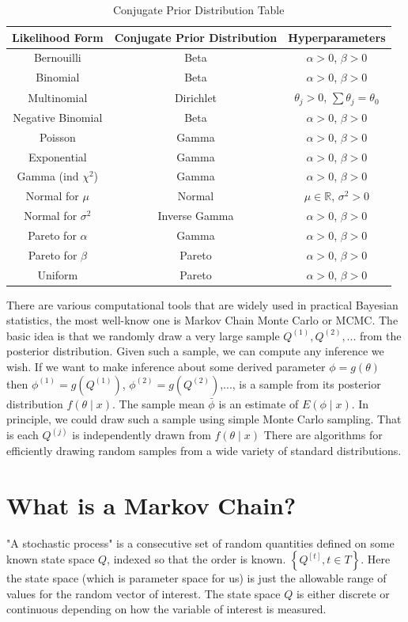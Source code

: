 \documentclass[lecture,12pt,]{pcms-l}
\numberwithin{section}{chapter}
\numberwithin{equation}{chapter}
\theoremstyle{plain}
\theoremstyle{definition}
\theoremstyle{definition}
\begin{document}
\begin{table}[h]
\caption{Conjugate Prior Distribution Table}
 \begin{tabular}{||c c c ||} 
 \hline
 Likelihood Form & Conjugate Prior Distribution & Hyperparameters  \\ [0.5ex]
 \hline\hline
 Bernouilli & Beta & $\alpha>0$, $\beta>0$ \\ 
 Binomial & Beta & $\alpha>0$, $\beta>0$   \\ 
 Multinomial & Dirichlet & $\theta_j>0$, $\sum \theta_j=\theta_0$  \\ 
 Negative Binomial & Beta & $\alpha>0$, $\beta>0$  \\ 
 Poisson & Gamma & $\alpha>0$, $\beta>0$  \\
 Exponential & Gamma & $\alpha>0$, $\beta>0$  \\
 Gamma (ind $\chi^2$) & Gamma & $\alpha>0$, $\beta>0$  \\
 Normal for $\mu$ & Normal & $\mu \in \mathbb{R}$, $\sigma^2>0$  \\
  Normal for $\sigma^2$ & Inverse Gamma & $\alpha>0$, $\beta>0$  \\
   Pareto for $\alpha$ & Gamma & $\alpha>0$, $\beta>0$  \\
    Pareto for $\beta$ & Pareto &$\alpha>0$, $\beta>0$  \\
 Uniform & Pareto & $\alpha>0$, $\beta>0$ \\ [1ex] 
 \hline
\end{tabular}
\end{table}

There are various computational tools that are widely used in practical Bayesian statistics, the most well-know one is Markov Chain Monte Carlo or MCMC. The basic idea is that we randomly draw a very large sample $Q^{(1)},Q^{(2)},...$ from the posterior distribution. Given such a sample, we can compute any inference we wish. If we want to make inference about some derived parameter $\phi=g(\theta)$ then $\phi^{(1)}=g(Q^{(1)})$, $\phi^{(2)}=g(Q^{(2)})$,..., is a sample from its posterior distribution $f(\theta \mid x)$. The sample mean $\bar{\phi}$ is an estimate of $E(\phi \mid x)$. In principle, we could draw such a sample using simple Monte Carlo sampling. That is each $Q^{(j)}$ is independently drawn from $f(\theta \mid x)$ There are algorithms for efficiently drawing random samples from a wide variety of standard distributions. 
\section{What is a Markov Chain?}
"A stochastic process" is a consecutive set of random quantities defined on some known state space $Q$, indexed so that the order is known. $ \left \{  Q^{[t]}, t \in T \right \}$. Here the state space (which is parameter space for us) is just the allowable range of values for the random vector of interest. The state space $Q$ is either discrete or continuous depending on how the variable of interest is measured. 
\end{document}
